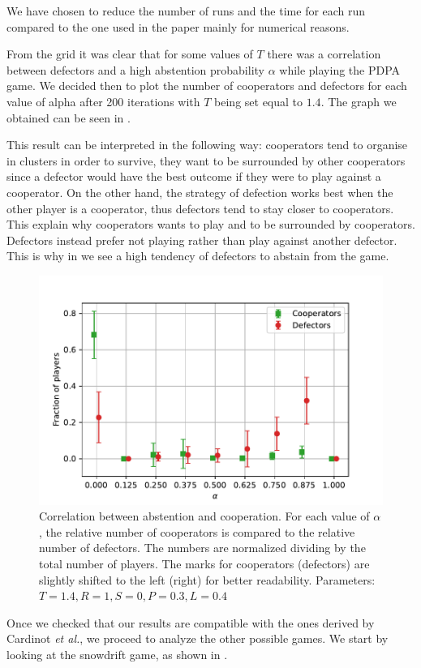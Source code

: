 \documentclass[12pt,oneside,a4paper,fleqn]{article}
\begin{document}
We have chosen to reduce the number of runs and the time for each run compared to the one used in the paper mainly for numerical reasons.

From the grid it was clear that for some values of $T$ there was a correlation between defectors and a high abstention probability $\alpha$ while playing the PDPA game.
We decided then to plot the number of cooperators and defectors for each value of alpha after 200 iterations with $T$ being set equal to $1.4$.
The graph we obtained can be seen in .

This result can be interpreted in the following way:
cooperators tend to organise in clusters in order to survive, they want to be surrounded by other cooperators since a defector would have the best outcome if they were to play against a cooperator.
On the other hand, the strategy of defection works best when the other player is a cooperator, thus defectors tend to stay closer to cooperators.
This explain why cooperators wants to play and to be surrounded by cooperators.
Defectors instead prefer not playing rather than play against another defector.
This is why in  we see a high tendency of defectors to abstain from the game.


\begin{figure}
    \centering
    \includegraphics[width = 0.7 \textwidth]{Images/alpha.pdf}
    \caption{Correlation between abstention and cooperation. For each value of $\alpha$, the relative number of cooperators is compared to the relative number of defectors. The numbers are normalized dividing by the total number of players. The marks for cooperators (defectors) are slightly shifted to the left (right) for better readability. Parameters: $T = 1.4, R = 1, S = 0, P = 0.3, L = 0.4$}
    \label{fig:correlation}
\end{figure}

Once we checked that our results are compatible with the ones derived by Cardinot \emph{et al.}, we proceed to analyze the other possible games.
We start by looking at the snowdrift game, as shown in .
\end{document}
